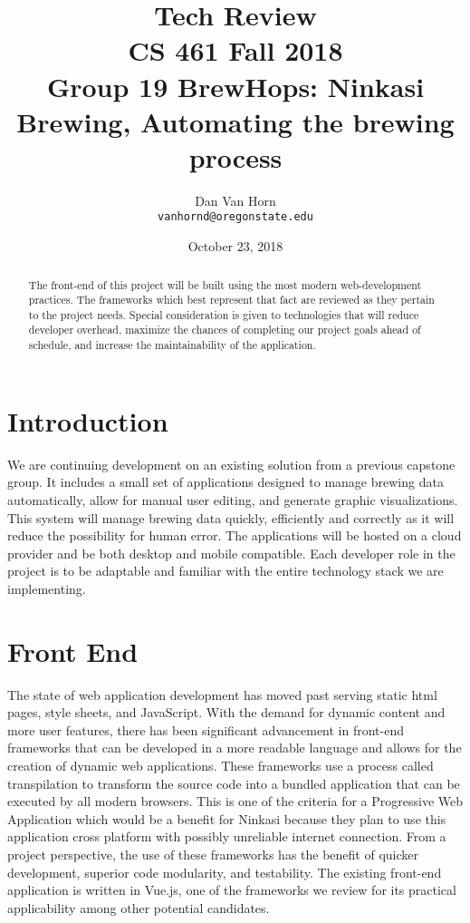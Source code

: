 \documentclass[draftclsnofoot,onecolumn,journal,letterpaper,compsoc,10pt]{IEEEtran}
\date{October 23, 2018}
\begin{document}
\begin{titlingpage}
    \title{Tech Review\\\large CS 461 Fall 2018\\Group 19 BrewHops: Ninkasi Brewing, Automating the brewing process}
    \author{
        Dan Van Horn \\
        \texttt{vanhornd@oregonstate.edu} \\
    }
    \maketitle
    \begin{abstract}
    The front-end of this project will be built using the most modern web-development practices. The frameworks which best represent that fact are reviewed as they pertain to the project needs. Special consideration is given to technologies that will reduce developer overhead, maximize the chances of completing our project goals ahead of schedule, and increase the maintainability of the application.
    \end{abstract}
    \pagebreak
    \tableofcontents
\end{titlingpage}
    \section{Introduction}
    We are continuing development on an existing solution from a previous capstone group. It includes a small set of applications designed to manage brewing data automatically, allow for manual user editing, and generate graphic visualizations. This system will manage brewing data quickly, efficiently and correctly as it will reduce the possibility for human error. The applications will be hosted on a cloud provider and be both desktop and mobile compatible. Each developer role in the project is to be adaptable and familiar with the entire technology stack we are implementing.
    \section{Front End}
    The state of web application development has moved past serving static html pages, style sheets, and JavaScript. With the demand for dynamic content and more user features, there has been significant advancement in front-end frameworks that can be developed in a more readable language and allows for the creation of dynamic web applications. These frameworks use a process called transpilation to transform the source code into a bundled application that can be executed by all modern browsers. This is one of the criteria for a Progressive Web Application which would be a benefit for Ninkasi because they plan to use this application cross platform with possibly unreliable internet connection. From a project perspective, the use of these frameworks has the benefit of quicker development, superior code modularity, and testability. The existing front-end application is written in Vue.js, one of the frameworks we review for its practical applicability among other potential candidates.
\end{document}
